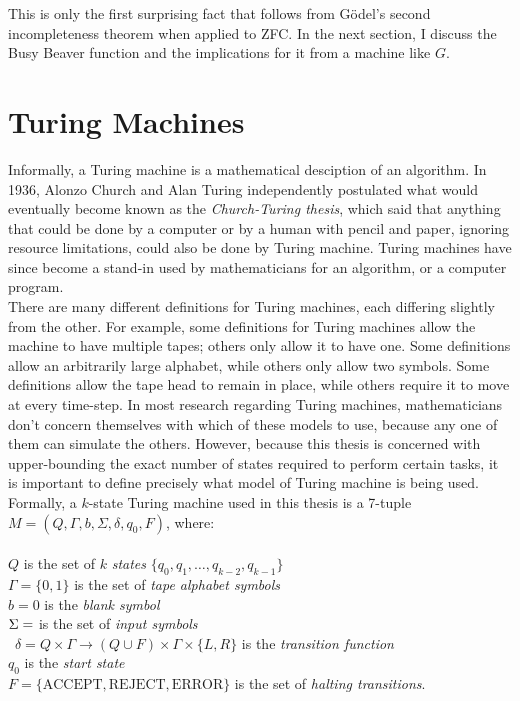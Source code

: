\documentclass[11pt]{report}
\begin{document}
This is only the first surprising fact that follows from G\"{o}del's second incompleteness theorem when applied to ZFC. In the next section, I discuss the Busy Beaver function and the implications for it from a machine like $G$.

\section{Turing Machines \label{sec:tm}}

Informally, a Turing machine is a mathematical desciption of an algorithm. In 1936, Alonzo Church and Alan Turing independently postulated what would eventually become known as the \emph{Church-Turing thesis}, which said that anything that could be done by a computer or by a human with pencil and paper, ignoring resource limitations, could also be done by Turing machine. Turing machines have since become a stand-in used by mathematicians for an algorithm, or a computer program. \\

There are many different definitions for Turing machines, each differing slightly from the other. For example, some definitions for Turing machines allow the machine to have multiple tapes; others only allow it to have one. Some definitions allow an arbitrarily large alphabet, while others only allow two symbols. Some definitions allow the tape head to remain in place, while others require it to move at every time-step. In most research regarding Turing machines, mathematicians don't concern themselves with which of these models to use, because any one of them can simulate the others. However, because this thesis is concerned with upper-bounding the exact number of states required to perform certain tasks, it is important to define precisely what model of Turing machine is being used. \\

Formally, a $k$-state Turing machine used in this thesis is a 7-tuple $M = (Q, \Gamma, b, \Sigma, \delta, q_0, F)$, where: \\ \\
$Q$ is the set of $k$ \emph{states} $\{q_0, q_1, \dots, q_{k-2}, q_{k-1}\}$ \\
$\Gamma = \{0, 1\}$ is the set of \emph{tape alphabet symbols} \\
$b = 0$ is the \emph{blank symbol} \\
$\Sigma = \empty$ is the set of \emph{input symbols} \\\
$\delta = Q \times \Gamma \rightarrow (Q \cup F) \times \Gamma \times \{L, R\}$ is the \emph{transition function} \\
$q_0$ is the \emph{start state} \\
$F = \{\textrm{ACCEPT}, \textrm{REJECT}, \textrm{ERROR}\}$ is the set of \emph{halting transitions}. \\
\end{document}
